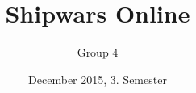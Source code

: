 \documentclass[10pt, a4paper]{report}
\begin{document}
\title{Shipwars Online}
\author{Group 4}
\date{December 2015, 3. Semester}
\maketitle
\tableofcontents
\listoffigures
\listoftables
\end{document}
